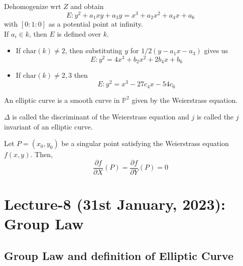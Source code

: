 \documentclass[oneside, 12pt]{scrbook}
\newcommand{\PP}{\mathbb{P}}
\theoremstyle{theorem}
\begin{document}
Dehomogenize wrt $Z$ and obtain 
\begin{equation}
E : y^2 + a_{1}xy + a_{3}y = x^3 + a_{2}x^2 + a_{4}x + a_{6}
\end{equation} 
with $[0:1:0]$ as a potential point at infinity. \\

If $a_{i} \in k$, then $E$ is defined over $k$. \\

\begin{itemize}
 \item If $\mathrm{char}(k) \neq 2$, then substituting $y$ for $1/2 (y -a_{1}x - a_{3})$ gives us 
 \begin{equation}
 E: y^2 = 4x^3 + b_{2}x^2 + 2b_{4}x + b_{6}
 \end{equation}
 \item If $\mathrm{char}(k) \neq 2,3 $ then 
 \begin{equation}
 E: y^2 = x^3 - 27c_{4}x - 54c_{6}
 \end{equation}
\end{itemize}

\begin{example}

\end{example}

\begin{definition}
An elliptic curve is a smooth curve in $\PP^2$ given by the Weierstrass equation.
\end{definition}

\begin{definition}
$\Delta$ is called the discriminant of the Weierstrass equation and $j$ is called the $j$ invariant of an elliptic curve.
\end{definition}

Let $P=(x_{0},y_{0})$ be a singular point satisfying the Weierstrass equation $f(x,y)$. Then, $$\frac{\partial f}{\partial X} (P)= \frac{\partial f}{\partial Y} (P) = 0$$


\chapter{Lecture-8 (31st January, 2023): Group Law}

\section{Group Law and definition of Elliptic Curve}

\end{document}
